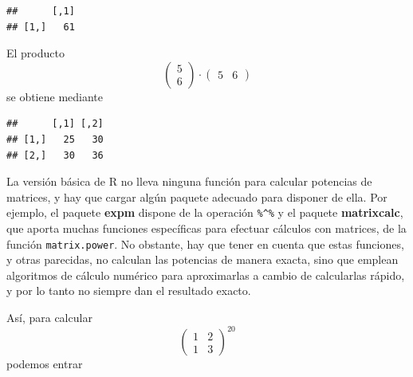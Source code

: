 \documentclass[]{book}
\newenvironment{Shaded}{\begin{snugshade}}{\end{snugshade}}
\newcommand{\DataTypeTok}[1]{\textcolor[rgb]{0.13,0.29,0.53}{#1}}
\newcommand{\DecValTok}[1]{\textcolor[rgb]{0.00,0.00,0.81}{#1}}
\newcommand{\KeywordTok}[1]{\textcolor[rgb]{0.13,0.29,0.53}{\textbf{#1}}}
\newcommand{\NormalTok}[1]{#1}
\newcommand{\OperatorTok}[1]{\textcolor[rgb]{0.81,0.36,0.00}{\textbf{#1}}}
\newcommand{\OtherTok}[1]{\textcolor[rgb]{0.56,0.35,0.01}{#1}}
\theoremstyle{definition}
\theoremstyle{definition}
\theoremstyle{definition}
\theoremstyle{remark}
\begin{document}
\begin{Shaded}
\end{Shaded}

\begin{verbatim}
##      [,1]
## [1,]   61
\end{verbatim}

El producto
\[
\left(\begin{array}{c}
5\\ 6\end{array}
\right)\cdot
\left(\begin{array}{cc}
5 & 6\end{array}\right) 
\]
se obtiene mediante

\begin{Shaded}
\end{Shaded}

\begin{verbatim}
##      [,1] [,2]
## [1,]   25   30
## [2,]   30   36
\end{verbatim}

La versión básica de R no lleva ninguna función para calcular potencias de matrices,
y hay que cargar algún paquete adecuado para disponer de ella. Por ejemplo,
el paquete \textbf{expm} dispone de la operación \texttt{\%\^{}\%} y el paquete \textbf{matrixcalc}, que aporta muchas funciones específicas para efectuar cálculos con matrices, de la función \texttt{matrix.power}. No obstante, hay que tener en cuenta que estas funciones, y otras parecidas, no calculan las potencias de manera exacta, sino que emplean algoritmos de cálculo numérico para aproximarlas a cambio de calcularlas rápido, y por lo tanto no siempre dan el resultado exacto.

Así, para calcular
\[
\left(\begin{array}{cc}
1 & 2 \\ 1 & 3\end{array}
\right)^{20}
\]
podemos entrar

\begin{Shaded}
\end{Shaded}
\end{document}

